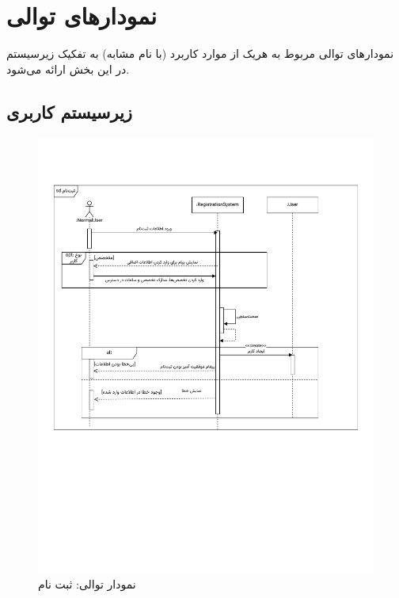 \chapter{نمودارهای توالی}


نمودارهای توالی مربوط به هریک از موارد کاربرد (با نام مشابه) به تفکیک زیرسیستم در این بخش ارائه می‌شود.

\newpage
\section{زیرسیستم کاربری}

\newpage

\begin{figure}[ht!]
	\centering
	\includegraphics[scale=0.6, page=1]{figs/OOD-Sequence-1.pdf}
	\caption{نمودار توالی: ثبت نام}
\end{figure}
\FloatBarrier
\newpage

